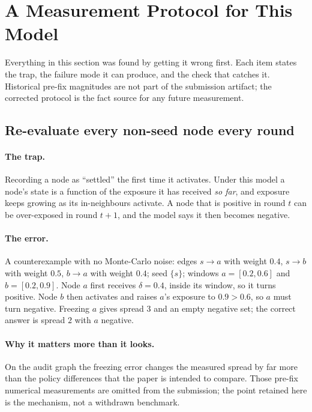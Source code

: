 \section{A Measurement Protocol for This Model}
\label{sec:protocol}

Everything in this section was found by getting it wrong first. Each item states the trap, the
failure mode it can produce, and the check that catches it. Historical pre-fix magnitudes are not
part of the submission artifact; the corrected protocol is the fact source for any future
measurement.

\subsection{Re-evaluate every non-seed node every round}

\paragraph{The trap.} Recording a node as ``settled'' the first time it activates. Under this model a
node's state is a function of the exposure it has received \emph{so far}, and exposure keeps growing
as its in-neighbours activate. A node that is positive in round $t$ can be over-exposed in round
$t+1$, and the model says it then becomes negative.

\paragraph{The error.} A counterexample with no Monte-Carlo noise: edges $s \to a$ with weight
$0.4$, $s \to b$ with weight $0.5$, $b \to a$ with weight $0.4$; seed $\{s\}$; windows
$a = [0.2, 0.6]$ and $b = [0.2, 0.9]$. Node $a$ first receives $\delta = 0.4$, inside its window, so
it turns positive. Node $b$ then activates and raises $a$'s exposure to $0.9 > 0.6$, so $a$ must
turn negative. Freezing $a$ gives spread $3$ and an empty negative set; the correct answer is spread
$2$ with $a$ negative.

\paragraph{Why it matters more than it looks.} On the audit graph the freezing error changes the
measured spread by far more than the policy differences that the paper is intended to compare.
Those pre-fix numerical measurements are omitted from the submission; the point retained here is
the mechanism, not a withdrawn benchmark.

